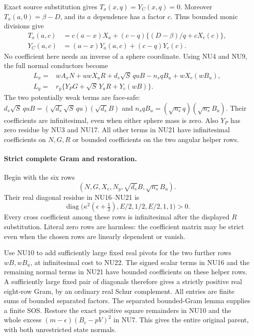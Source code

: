Exact source substitution gives $T_x(x,q)=Y_C(x,q)=0$.
Moreover $T_x(a,0)=\beta-D$, and its $a$ dependence has a
factor $c$. Thus bounded monic divisions give
\[
\begin{split}
 T_x(a,c)&=c(a-x)X_a+(c-q)\{(D-\beta)/q+cX_c(c)\},\\
 Y_C(a,c)&=(a-x)Y_a(a,c)+(c-q)Y_c(c).
\end{split}\tag{NU20}
\]
No coefficient here needs an inverse of a sphere coordinate.
Using NU4 and NU9, the full normal conductors become
\[
\begin{split}
 L_x={}&wA_xN+uwX_aR
       +d_s\sqrt S\,q u B-n_sqB_u+wX_c(wB_u),\\
 L_y={}&r_y\{Y_PG+\sqrt S\,Y_aR+Y_c(wB)\}.
\end{split}\tag{NU21}
\]
The two potentially weak terms are face-safe:
$d_s\sqrt S\,quB=(\sqrt{d_s}\sqrt S\,qu)(\sqrt{d_s}B)$
and $n_sqB_u=(\sqrt{n_s}q)(\sqrt{n_s}B_u)$.
Their coefficients are infinitesimal, even when either sphere
mass is zero. Also $Y_P$ has zero residue by NU3 and NU17.
All other terms in NU21 have infinitesimal coefficients on
$N,G,R$ or bounded coefficients on the two angular helper rows.

\paragraph{Strict complete Gram and restoration.}
Begin with the six rows
\[
 (N,G,X_e,N_y,\sqrt{d_s}B,\sqrt{n_s}B_u).
 \tag{NU22}
\]
Their real diagonal residue in NU16--NU21 is
\[
 \operatorname{diag}\bigl(
 \kappa^2(\epsilon+\tfrac12),E/2,1/2,E/2,1,1\bigr)>0.
 \tag{NU23}
\]
Every cross coefficient among these rows is infinitesimal after
the displayed $R$ substitution. Literal zero rows are harmless:
the coefficient matrix may be strict even when the chosen rows
are linearly dependent or vanish.

Use NU10 to add sufficiently large fixed real pivots for the
two further rows $wB,wB_u$, at infinitesimal cost to NU22.
The signed scalar terms in NU16 and the remaining normal terms
in NU21 have bounded coefficients on these helper rows.
A sufficiently large fixed pair of diagonals therefore gives
a strictly positive real eight-row Gram, by an ordinary real
Schur complement. All entries are finite sums of bounded separated
factors. The separated bounded-Gram lemma supplies a finite SOS.
Restore the exact positive square remainders in NU10 and the
whole excess $(m-\epsilon)(B_c-pV)^2$ in NU7. This gives the
entire original parent, with both unrestricted state normals.

